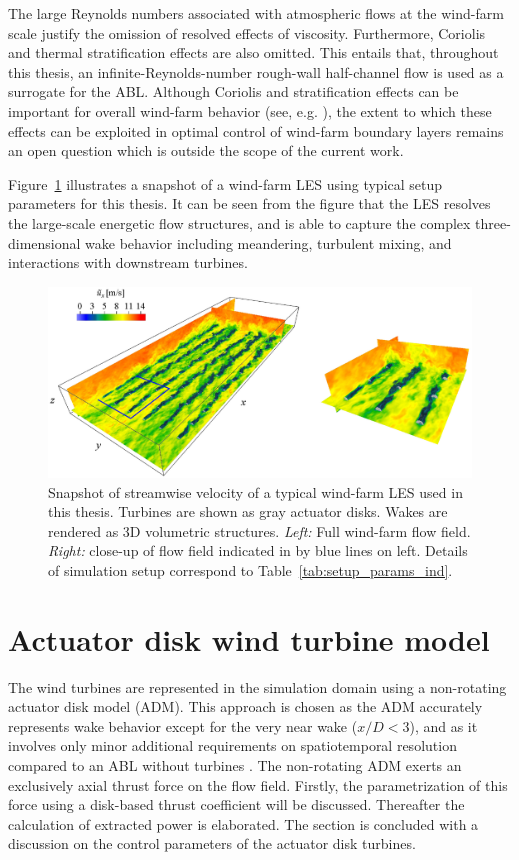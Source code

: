 The large Reynolds numbers associated with atmospheric flows at the wind-farm scale justify the omission of resolved effects of viscosity. Furthermore, Coriolis and thermal stratification effects are also omitted. This entails that, throughout this thesis, an infinite-Reynolds-number rough-wall half-channel flow is used as a surrogate for the ABL. Although Coriolis and stratification effects can be important for overall wind-farm behavior (see, e.g. \citealp{allaerts2015large, allaerts2017boundary}), the extent to which these effects can be exploited in optimal control of wind-farm boundary layers remains an open question which is outside the scope of the current work. 

Figure~\ref{fig:les_field} illustrates a snapshot of a wind-farm LES using typical setup parameters for this thesis. It can be seen from the figure that the LES resolves the large-scale energetic flow structures, and is able to capture the complex three-dimensional wake behavior including meandering, turbulent mixing, and interactions with downstream turbines.

\begin{figure}
	\centering
	\includegraphics[width=\linewidth]{chapters/methodology/les_field.eps}
	\caption{Snapshot of streamwise velocity of a typical wind-farm LES used in this thesis. Turbines are shown as gray actuator disks. Wakes are rendered as 3D volumetric structures. \emph{Left: } Full wind-farm flow field. \emph{Right: } close-up of flow field indicated in by blue lines on left. Details of simulation setup correspond to Table~\ref{tab:setup_params_ind}. \label{fig:les_field}}
\end{figure}

\section{Actuator disk wind turbine model}\label{sec:meth_adm}
The wind turbines are represented in the simulation domain using a non-rotating actuator disk model (ADM). This approach is chosen as the ADM accurately represents wake behavior except for the very near wake ($x/D < 3$), and as it involves only minor additional requirements on spatiotemporal resolution compared to an ABL without turbines \citep{mikkelsen2003actuator, wu2015modeling}. The non-rotating ADM exerts an exclusively axial thrust force on the flow field. Firstly, the parametrization of this force using a disk-based thrust coefficient will be discussed. Thereafter the calculation of extracted power is elaborated. The section is concluded with a discussion on the control parameters of the actuator disk turbines.

